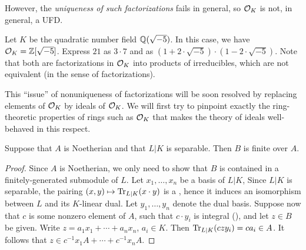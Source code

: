 However, the \emph{uniqueness of such factorizations} fails in general, so $\mathcal{O}_{K}$ is not, in general, a UFD.
\begin{example}
  Let $K$ be the quadratic number field $\mathbb{Q}(\sqrt{-5})$.
  In this case, we have $\mathcal{O}_{K} = \mathbb{Z}[\sqrt{-5}]$.
  Express $21$ as $3 \cdot 7$ and as $(1 + 2 \cdot \sqrt{-5}) \cdot (1 - 2 \cdot \sqrt{-5})$.
  Note that both are factorizations in $\mathcal{O}_{K}$ into products of irreducibles, which are not equivalent (in the sense of factorizations).
\end{example}

This ``issue'' of nonuniqueness of factorizations will be soon resolved by replacing elements of $\mathcal{O}_{K}$ by ideals of $\mathcal{O}_{K}$.
We will first try to pinpoint exactly the ring-theoretic properties of rings such as $\mathcal{O}_{K}$ that makes the theory of ideals well-behaved in this respect.

\begin{proposition}
  Suppose that $A$ is Noetherian and that $L|K$ is separable.
  Then $B$ is finite over $A$.
\end{proposition}
\begin{proof}
  Since $A$ is Noetherian, we only need to show that $B$ is contained in a finitely-generated submodule of $L$.
  Let $x_{1},\ldots,x_{n}$ be a basis of $L|K$, 
  Since $L|K$ is separable, the pairing $(x,y) \mapsto \operatorname{Tr}_{L|K}(x \cdot y)$ is a , hence it induces an isomorphism between $L$ and its $K$-linear dual.
  Let $y_{1},\ldots,y_{n}$ denote the dual basis.
  Suppose now that $c$ is some nonzero element of $A$, such that $c \cdot y_{i}$ is integral (), and let $z \in B$ be given.
  Write $z = a_{1}x_{1} + \cdots + a_{n} x_{n}$, $a_{i} \in K$.
  Then $\operatorname{Tr}_{L|K}(czy_{i}) = ca_{i} \in A$.
  It follows that $z \in c^{-1}x_{1} A + \cdots + c^{-1} x_{n} A$.
\end{proof}

